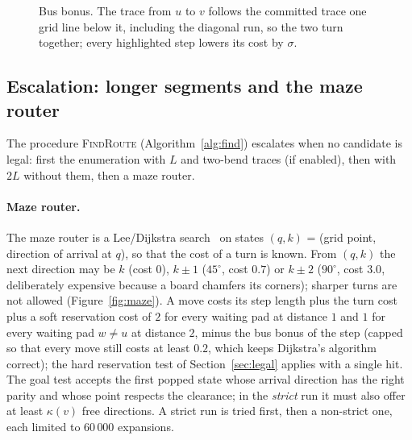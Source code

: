\documentclass[11pt,a4paper]{article}
\newcommand{\gridbg}[4]{\draw[gridc,line width=0.4pt,step={(1,-1)}] (#1,#2) grid (#3,#4);}
\theoremstyle{remark}
\begin{document}
\begin{figure}[t]
\centering
{}
\caption{Bus bonus. The trace from $u$ to $v$ follows the committed trace one grid line below it, including the
diagonal run, so the two turn together; every highlighted step lowers its cost by $\sigma$.}
\label{fig:bus}
\end{figure}

\subsection{Escalation: longer segments and the maze router}\label{sec:maze}

The procedure \textsc{FindRoute} (Algorithm~\ref{alg:find}) escalates when no candidate is legal:
first the enumeration with $L$ and two-bend traces (if enabled), then with $2L$ without them, then a maze router.

\paragraph{Maze router.} The maze router is a Lee/Dijkstra search~\cite{lee1961,dijkstra1959} on states
$(q,k)$ = (grid point, direction of arrival at $q$), so that the cost of a turn is known. From $(q,k)$ the next
direction may be $k$ (cost $0$), $k\pm1$ ($45^\circ$, cost $0.7$) or $k\pm2$ ($90^\circ$, cost $3.0$, deliberately
expensive because a board chamfers its corners); sharper turns are not allowed (Figure~\ref{fig:maze}). A move costs
its step length plus the turn cost plus a soft reservation cost of $2$ for every waiting pad at distance $1$ and $1$
for every waiting pad $w\ne u$ at distance $2$, minus the bus bonus of the step (capped so that every move still costs
at least $0.2$, which keeps Dijkstra's algorithm correct); the hard reservation test of Section~\ref{sec:legal}
applies with a single hit. The goal test accepts the first popped state whose arrival direction has the right parity
and whose point respects the clearance; in the \emph{strict} run it must also offer at least $\kappa(v)$ free
directions. A strict run is tried first, then a non-strict one, each limited to $60\,000$ expansions.
\end{document}
